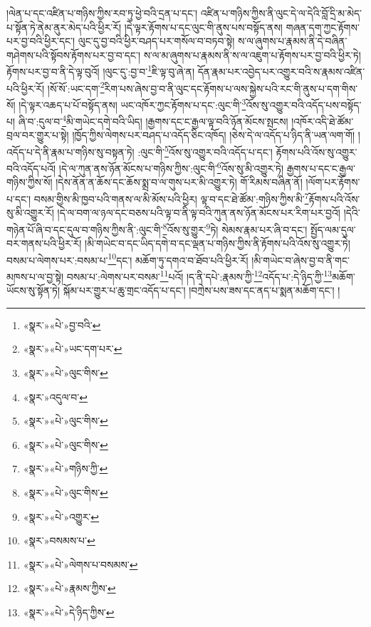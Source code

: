 །ལེན་པ་དང་འཛིན་པ་གཉིས་ཀྱིས་རབ་ཏུ་ཕྱེ་བའི་དྲན་པ་དང་། འཛིན་པ་གཉིས་ཀྱིས་ནི་ལུང་དེ་ལ་དེའི་བློ་དྲི་མ་མེད་པ་སྟོན་ཏེ་ནེམ་ནུར་མེད་པའི་ཕྱིར་རོ། །དེ་ལྟར་རྟོགས་པ་དང་ལུང་གི་ནུས་པས་བསྟོད་ནས། གཞན་དག་ཀྱང་རྟོགས་པར་བྱ་བའི་ཕྱིར་དང་། ལུང་དུ་བྱ་བའི་ཕྱིར་བཤད་པར་གསོལ་བ་བཏབ་སྟེ། ས་ལ་ཞུགས་པ་རྣམས་ནི་དེ་བཞིན་གཤེགས་པའི་སྟོབས་རྟོགས་པར་བྱ་བ་དང་། ས་ལ་མ་ཞུགས་པ་རྣམས་ནི་ས་ལ་འཇུག་པ་རྟོགས་པར་བྱ་བའི་ཕྱིར་ཏེ། རྟོགས་པར་བྱ་བ་ནི་དེ་ལྟ་བུའོ། །ལུང་དུ་:བྱ་བ་\footnote{«སྣར་»«པེ་»བྱ་བའི་}ཇི་ལྟ་བུ་ཞེ་ན། དོན་རྣམ་པར་འབྱེད་པར་འགྱུར་བའི་ས་རྣམས་འཛིན་པའི་ཕྱིར་རོ། །སོ་སོ་:ཡང་དག་\footnote{«སྣར་»«པེ་»ཡང་དག་པར་}རིག་པས་ཞེས་བྱ་བ་ནི་ལུང་དང་རྟོགས་པ་ལས་སྐྱེས་པའི་རང་གི་ནུས་པ་དག་གིས་སོ། །དེ་ལྟར་འཆད་པ་པོ་བསྟོད་ནས། ཡང་འཁོར་ཀྱང་རྟོགས་པ་དང་:ལུང་གི་\footnote{«སྣར་»«པེ་»ལུང་གིས་}འོས་སུ་འགྱུར་བའི་འདོད་པས་བསྟོད་པ། ཞི་བ་:དུལ་བ་\footnote{«སྣར་»འདུལ་བ་}མི་གཡེང་དགེ་བའི་ཡིད། །རྒྱགས་དང་ང་རྒྱལ་ལྟ་བའི་ཉོན་མོངས་སྤངས། །འཁོར་འདི་ཐེ་ཚོམ་བྲལ་བར་གྱུར་པ་སྟེ། །ཁྱོད་ཀྱིས་ལེགས་པར་བཤད་པ་འདོད་ཅིང་འཁོད། །ཅེས་དེ་ལ་འདོད་པ་ཉིད་ནི་ཡན་ལག་གོ། །འདོད་པ་དེ་ནི་རྣམ་པ་གཉིས་སུ་བསྟན་ཏེ། :ལུང་གི་\footnote{«སྣར་»«པེ་»ལུང་གིས་}འོས་སུ་འགྱུར་བའི་འདོད་པ་དང་། རྟོགས་པའི་འོས་སུ་འགྱུར་བའི་འདོད་པའོ། །དེ་ལ་ཀུན་ནས་ཉོན་མོངས་པ་གཉིས་ཀྱིས་:ལུང་གི་\footnote{«སྣར་»«པེ་»ལུང་གིས་}འོས་སུ་མི་འགྱུར་ཏེ། རྒྱགས་པ་དང་ང་རྒྱལ་གཉིས་ཀྱིས་སོ། །དེས་ནོན་ན་ཆོས་དང་ཆོས་སྨྲ་བ་ལ་གུས་པར་མི་འགྱུར་ཏེ། གོ་རིམས་བཞིན་ནོ། །ལོག་པར་རྟོགས་པ་དང་། བསམ་གྱིས་མི་ཁྱབ་པའི་གནས་ལ་མི་མོས་པའི་ཕྱིར། ལྟ་བ་དང་ཐེ་ཚོམ་:གཉིས་ཀྱིས་མི་\footnote{«སྣར་»«པེ་»གཉིས་ཀྱི་}རྟོགས་པའི་འོས་སུ་མི་འགྱུར་རོ། །དེ་ལ་བག་ལ་ཉལ་དང་བཅས་པའི་ལྟ་བ་ནི་ལྟ་བའི་ཀུན་ནས་ཉོན་མོངས་པར་རིག་པར་བྱའོ། །དེའི་གཉེན་པོ་ཞི་བ་དང་དུལ་བ་གཉིས་ཀྱིས་ནི་:ལུང་གི་\footnote{«སྣར་»«པེ་»ལུང་གིས་}འོས་སུ་གྱུར་\footnote{«སྣར་»«པེ་»འགྱུར་}ཏེ། སེམས་རྣམ་པར་ཞི་བ་དང་། སྤྱོད་ལམ་དུལ་བར་གནས་པའི་ཕྱིར་རོ། །མི་གཡེང་བ་དང་ཡིད་དགེ་བ་དང་ལྡན་པ་གཉིས་ཀྱིས་ནི་རྟོགས་པའི་འོས་སུ་འགྱུར་ཏེ། བསམ་པ་ལེགས་པར་:བསམ་པ་\footnote{«སྣར་»བསམས་པ་}དང་། མཆོག་ཏུ་དགའ་བ་ཐོབ་པའི་ཕྱིར་རོ། །མི་གཡེང་བ་ཞེས་བྱ་བ་ནི་གང་མཁས་པ་ལ་བྱ་སྟེ། བསམ་པ་:ལེགས་པར་བསམ་\footnote{«སྣར་»«པེ་»ལེགས་པ་བསམས་}པའོ། །ད་ནི་དཔེ་:རྣམས་ཀྱི་\footnote{«སྣར་»«པེ་»རྣམས་ཀྱིས་}འདོད་པ་:དེ་ཉིད་ཀྱི་\footnote{«སྣར་»«པེ་»དེ་ཉིད་ཀྱིས་}མཆོག་ཡོངས་སུ་སྟོན་ཏེ། སྐོམ་པར་གྱུར་པ་ཆུ་གྲང་འདོད་པ་དང་། །བཀྲེས་པས་ཟས་དང་ནད་པ་སྨན་མཆོག་དང་། །
